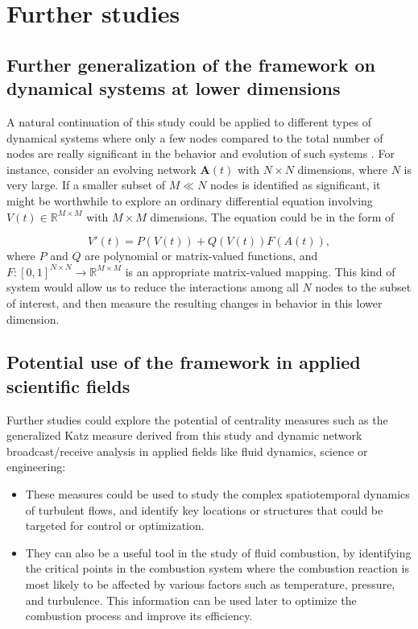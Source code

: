 
\chapter{Further studies}
\label{chap:further}
 
\section*{Further generalization of the framework on dynamical systems at lower dimensions}
A natural continuation of this study could be applied to different types of dynamical systems where only a few nodes compared to the total number of nodes are really significant in the behavior and evolution of such systems \cite{grindrod2014dynamical}. For instance, consider an evolving network $\mathbf{A}(t)$ with $N \times N$ dimensions, where $N$ is very large. If a smaller subset of $M\ll N$ nodes is identified as significant, it might be worthwhile to explore an ordinary differential equation involving $V(t)\in \mathbb{R}^{M\times M}$ with $M\times M$ dimensions. The equation could be in the form of 

$$V'(t)=P(V(t)) + Q(V(t))F(A(t)),$$ where $P$ and $Q$ are polynomial or matrix-valued functions, and $F: [0, 1]^{N×N} \to \mathbb{R}^{M\times M}$ is an appropriate matrix-valued mapping. This kind of system would allow us to reduce the interactions among all $N$ nodes to the subset of interest, and then measure the resulting changes in behavior in this lower dimension.

\section*{Potential use of the framework in applied scientific fields} 
Further studies could explore the potential of centrality measures such as the generalized Katz measure derived from this study and dynamic network broadcast/receive analysis in applied fields like fluid dynamics,  science or engineering: 

\begin{itemize}
  \item These measures could be used to study the complex spatiotemporal dynamics of turbulent flows, and identify key locations or structures that could be targeted for control or optimization. 
  \item They can also be a useful tool in the study of fluid combustion, by identifying the critical points in the combustion system where the combustion reaction is most likely to be affected by various factors such as temperature, pressure, and turbulence. This information can be used later to optimize the combustion process and improve its efficiency.
\end{itemize}
	
